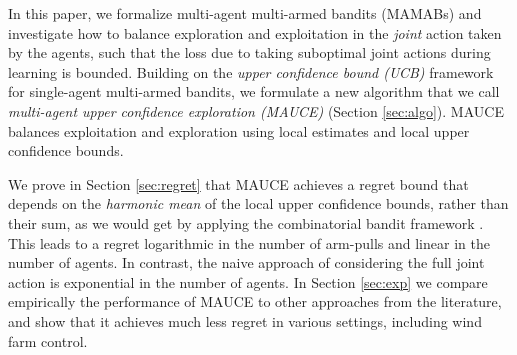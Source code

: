 \documentclass{article}
\def\hado#1{\textcolor{RubineRed}{\textbf{Hado: ``#1''}}}
\begin{document}
In this paper, we formalize multi-agent multi-armed bandits (MAMABs) and investigate how to balance
exploration and exploitation in the \emph{joint} action taken by the agents, such that the loss due
to taking suboptimal joint actions during learning is bounded. Building on the \emph{upper
confidence bound (UCB)} framework \cite{auer2002finite} for single-agent multi-armed bandits, we
formulate a new algorithm that we call \emph{multi-agent upper confidence exploration (MAUCE)}
(Section \ref{sec:algo}). MAUCE balances exploitation and exploration using local estimates and
local upper confidence bounds.


We prove in Section \ref{sec:regret} that MAUCE achieves a regret bound that depends on the
\emph{harmonic mean} of the local upper confidence bounds, rather than their sum, as
we would get by applying the combinatorial bandit framework
\cite{cesa2012combinatorial,chen2013combinatorial}. This leads to a regret logarithmic in
the number of arm-pulls and linear in the number of agents. In contrast, the naive approach of
considering the full joint action is exponential in the number of agents. In Section
\ref{sec:exp} we compare empirically the performance of MAUCE to other approaches from the
literature, and show that it achieves much less regret in various settings, including wind farm
control.


\end{document}
